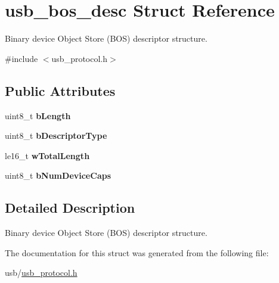\hypertarget{structusb__bos__desc}{}\section{usb\+\_\+bos\+\_\+desc Struct Reference}
\label{structusb__bos__desc}


Binary device Object Store (B\+OS) descriptor structure.  




{\ttfamily \#include $<$usb\+\_\+protocol.\+h$>$}

\subsection*{Public Attributes}
\begin{DoxyCompactItemize}
\item 
\mbox{\label{structusb__bos__desc_a9e7d61de2296a3a7f411ab889ca1db2c}} 
uint8\+\_\+t {\bfseries b\+Length}
\item 
\mbox{\label{structusb__bos__desc_a003979ed9a70c3a3583194620a8d8363}} 
uint8\+\_\+t {\bfseries b\+Descriptor\+Type}
\item 
\mbox{\label{structusb__bos__desc_aa98e1c6a3b086a70fd5fbf10ef45ae89}} 
le16\+\_\+t {\bfseries w\+Total\+Length}
\item 
\mbox{\label{structusb__bos__desc_ab1bbeb366ab8d4d96278fadd5c2d26a5}} 
uint8\+\_\+t {\bfseries b\+Num\+Device\+Caps}
\end{DoxyCompactItemize}


\subsection{Detailed Description}
Binary device Object Store (B\+OS) descriptor structure. 

The documentation for this struct was generated from the following file\+:\begin{DoxyCompactItemize}
\item 
usb/\hyperlink{usb__protocol_8h}{usb\+\_\+protocol.\+h}\end{DoxyCompactItemize}
